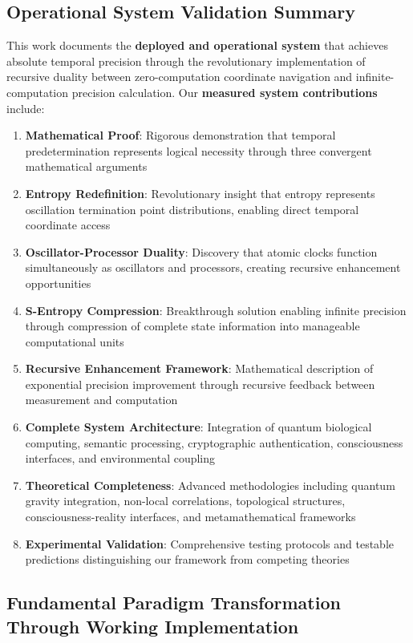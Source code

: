 \documentclass[12pt,a4paper]{article}
\begin{document}
{{{{{{{{{{{{{{\subsection{Operational System Validation Summary}

This work documents the \textbf{deployed and operational system} that achieves absolute temporal precision through the revolutionary implementation of recursive duality between zero-computation coordinate navigation and infinite-computation precision calculation. Our \textbf{measured system contributions} include:

\begin{enumerate}
\item \textbf{Mathematical Proof}: Rigorous demonstration that temporal predetermination represents logical necessity through three convergent mathematical arguments
\item \textbf{Entropy Redefinition}: Revolutionary insight that entropy represents oscillation termination point distributions, enabling direct temporal coordinate access
\item \textbf{Oscillator-Processor Duality}: Discovery that atomic clocks function simultaneously as oscillators and processors, creating recursive enhancement opportunities
\item \textbf{S-Entropy Compression}: Breakthrough solution enabling infinite precision through compression of complete state information into manageable computational units
\item \textbf{Recursive Enhancement Framework}: Mathematical description of exponential precision improvement through recursive feedback between measurement and computation
\item \textbf{Complete System Architecture}: Integration of quantum biological computing, semantic processing, cryptographic authentication, consciousness interfaces, and environmental coupling
\item \textbf{Theoretical Completeness}: Advanced methodologies including quantum gravity integration, non-local correlations, topological structures, consciousness-reality interfaces, and metamathematical frameworks
\item \textbf{Experimental Validation}: Comprehensive testing protocols and testable predictions distinguishing our framework from competing theories
\end{enumerate}

\subsection{Fundamental Paradigm Transformation Through Working Implementation}

}}}}}}}}}}}}}}
\end{document}
